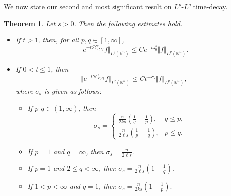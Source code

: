 \documentclass[12pt, reqno]{amsart}
\newtheorem{theorem}{Theorem}[section]
\theoremstyle{definition}
\theoremstyle{remark}
\numberwithin{equation}{section}
\newcommand{\APQ}{\mathcal{H}_{P, Q}}
\begin{document}
We now state our second and most significant result on $L^p$-$L^q$ time-decay.

\begin{theorem}
\label{Lpmapping}
Let $s>0$. Then the following estimates hold.

\begin{itemize}
\item If $t>1$, then, for all $p,q\in[1,\infty]$,
\begin{equation}
\label{lpest}
    \Vert e^{-t\APQ^s}f\Vert_{L^q(\mathbb R^n)}
    \leq
    C e^{-t\lambda_0^s}
    \Vert f\Vert_{L^p(\mathbb R^n)}.
\end{equation}

\item If $0<t\leq1$, then
\begin{equation}
\label{lpest1}
    \Vert e^{-t\APQ^s}f\Vert_{L^q(\mathbb R^n)}
    \leq
    C t^{-\sigma_s}
    \Vert f\Vert_{L^p(\mathbb R^n)},
\end{equation}
where $\sigma_s$ is given as follows:
\begin{itemize}
\item[(i)] If $p,q\in(1,\infty)$, then
\[
    \sigma_s=
    \begin{cases}
    \displaystyle
    \frac{n}{2k s}
    \left(\frac1q-\frac1p\right),
    & q\leq p,\\[3mm]
    \displaystyle
    \frac{n}{2\ell s}
    \left(\frac1p-\frac1q\right),
    & p\leq q.
    \end{cases}
\]

\item[(ii)] If $p=1$ and $q=\infty$, then $ \sigma_s=\frac{n}{2\ell s}.$

\item[(iii)] If $p=1$ and $2\leq q<\infty$, then $ \sigma_s=
    \frac{n}{2\ell s}
    \left(1-\frac1q\right).$

\item[(iv)] If $1<p<\infty$ and $q=1$, then $ \sigma_s=
    \frac{n}{2k s}
    \left(1-\frac1p\right).$
\end{itemize}
\end{itemize}
\end{theorem}
\end{document}
